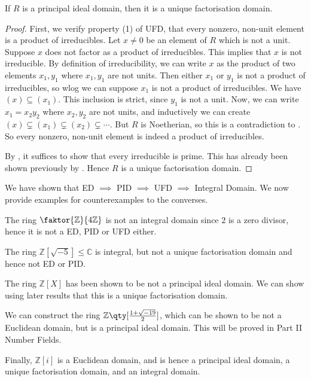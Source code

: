 \begin{theorem} \label{thm:10.8}
	If $R$ is a principal ideal domain, then it is a unique factorisation domain.
\end{theorem}

\begin{proof}
	First, we verify property (1) of UFD, that every nonzero, non-unit element is a product of irreducibles.
	Let $x \neq 0$ be an element of $R$ which is not a unit.
	Suppose $x$ does not factor as a product of irreducibles.
	This implies that $x$ is not irreducible.
	By definition of irreducibility, we can write $x$ as the product of two elements $x_1, y_1$ where $x_1, y_1$ are not units.
	Then either $x_1$ or $y_1$ is not a product of irreducibles, so wlog we can suppose $x_1$ is not a product of irreducibles.
	We have $(x) \subseteq (x_1)$.
	This inclusion is strict, since $y_1$ is not a unit.
	Now, we can write $x_1 = x_2 y_2$ where $x_2, y_2$ are not units, and inductively we can create $(x) \subsetneq (x_1) \subsetneq (x_2) \subsetneq \cdots$.
	But $R$ is Noetherian, so this is a contradiction to .
	So every nonzero, non-unit element is indeed a product of irreducibles.

	By , it suffices to show that every irreducible is prime.
	This has already been shown previously by .
	Hence $R$ is a unique factorisation domain.
\end{proof}

\begin{example}
	We have shown that ED $\implies$ PID $\implies$ UFD $\implies$ Integral Domain.
	We now provide examples for counterexamples to the converses.

	The ring $\faktor{\mathbb Z}{4\mathbb Z}$ is not an integral domain since $2$ is a zero divisor, hence it is not a ED, PID or UFD either.

	The ring $\mathbb Z[\sqrt{-5}] \leq \mathbb C$ is integral, but not a unique factorisation domain and hence not ED or PID.

	The ring $\mathbb Z[X]$ has been shown to be not a principal ideal domain.
	We can show using later results that this is a unique factorisation domain.

	We can construct the ring $\mathbb Z\qty[\frac{1+\sqrt{-19}}{2}]$, which can be shown to be not a Euclidean domain, but is a principal ideal domain.
	This will be proved in Part II Number Fields.

	Finally, $\mathbb Z[i]$ is a Euclidean domain, and is hence a principal ideal domain, a unique factorisation domain, and an integral domain.
\end{example}


